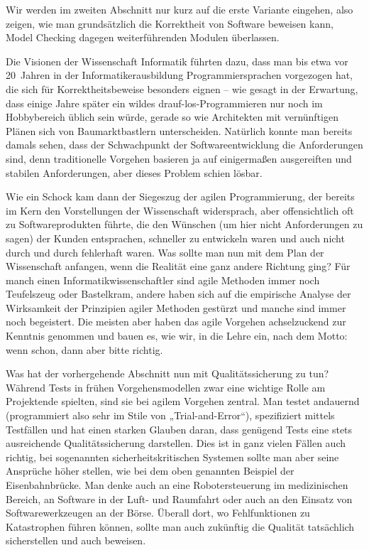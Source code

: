 Wir werden im zweiten Abschnitt nur kurz auf die erste Variante eingehen, also zeigen, wie man grundsätzlich die Korrektheit von Software beweisen kann, Model Checking dagegen weiterführenden Modulen überlassen.

Die Visionen der Wissenschaft Informatik führten dazu, dass man bis etwa vor 20~Jahren in der Informatikerausbildung Programmiersprachen vorgezogen hat, die sich für Korrektheitsbeweise besonders eignen -- wie gesagt in der Erwartung, dass einige Jahre später ein wildes drauf-los-Programmieren nur noch im Hobbybereich üblich sein würde, gerade so wie Architekten mit vernünftigen Plänen sich von Baumarktbastlern unterscheiden. Natürlich konnte man bereits damals sehen, dass der Schwachpunkt der Softwareentwicklung die Anforderungen sind, denn traditionelle Vorgehen basieren ja auf einigermaßen ausgereiften und stabilen Anforderungen, aber dieses Problem schien lösbar.

Wie ein Schock kam dann der Siegeszug der agilen Programmierung, der bereits im Kern den Vorstellungen der Wissenschaft widersprach, aber offensichtlich oft zu Softwareprodukten führte, die den Wünschen (um hier nicht Anforderungen zu sagen) der Kunden entsprachen, schneller zu entwickeln waren und auch nicht durch und durch fehlerhaft waren. Was sollte man nun mit dem Plan der Wissenschaft anfangen, wenn die Realität eine ganz andere Richtung ging? Für manch einen Informatik\-wissen\-schaftler sind agile Methoden immer noch Teufelszeug oder Bastelkram, andere haben sich auf die empirische Analyse der Wirksamkeit der Prinzipien agiler Methoden gestürzt und manche sind immer noch begeistert. Die meisten aber haben das agile Vorgehen achselzuckend zur Kenntnis genommen und bauen es, wie wir, in die Lehre ein, nach dem Motto: wenn schon, dann aber bitte richtig.

\vspace{1mm} %

Was hat der vorhergehende Abschnitt nun mit Qualitätssicherung zu tun? Während Tests in frühen Vorgehensmodellen zwar eine wichtige Rolle am Projektende spielten, sind sie bei agilem Vorgehen zentral. Man testet andauernd (programmiert also sehr im Stile von „Trial-and-Error“), spezifiziert mittels Testfällen und hat einen starken Glauben daran, dass genügend Tests eine stets ausreichende Qualitätssicherung darstellen. Dies ist in ganz vielen Fällen auch richtig, bei sogenannten sicherheits\-kritischen Systemen sollte man aber seine Ansprüche höher stellen, wie bei dem oben genannten Beispiel der Eisenbahnbrücke. Man denke auch an eine Robotersteuerung im medizinischen Bereich, an Software in der Luft- und Raumfahrt oder auch an den Einsatz von Softwarewerkzeugen an der Börse. Überall dort, wo Fehlfunktionen zu Katastrophen führen können, sollte man auch zukünftig die Qualität tatsächlich sicherstellen und auch beweisen.

